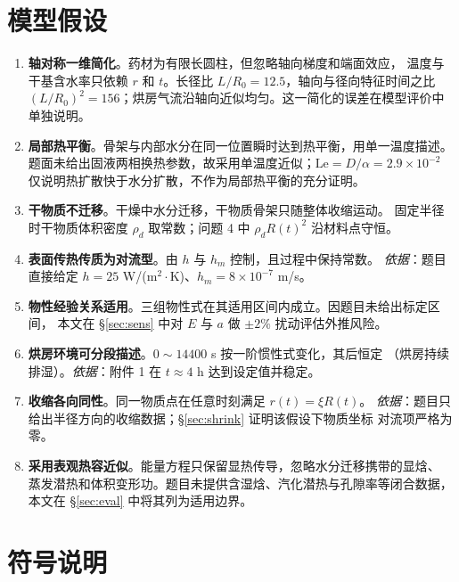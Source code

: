 \documentclass[bwprint]{cumcmthesis}
\begin{document}
\section{模型假设}

\begin{enumerate}[leftmargin=1.9em,itemsep=2pt]
\item \textbf{轴对称一维简化}。药材为有限长圆柱，但忽略轴向梯度和端面效应，
温度与干基含水率只依赖 $r$ 和 $t$。长径比 $L/R_0=12.5$，轴向与径向特征时间之比
$(L/R_0)^2=156$；烘房气流沿轴向近似均匀。这一简化的误差在模型评价中单独说明。
\item \textbf{局部热平衡}。骨架与内部水分在同一位置瞬时达到热平衡，用单一温度描述。
题面未给出固液两相换热参数，故采用单温度近似；$\mathrm{Le}=D/\alpha=2.9\times10^{-2}$
仅说明热扩散快于水分扩散，不作为局部热平衡的充分证明。
\item \textbf{干物质不迁移}。干燥中水分迁移，干物质骨架只随整体收缩运动。
固定半径时干物质体积密度 $\rho_d$ 取常数；问题 4 中 $\rho_dR(t)^2$ 沿材料点守恒。
\item \textbf{表面传热传质为对流型}。由 $h$ 与 $h_m$ 控制，且过程中保持常数。
\emph{依据}：题目直接给定 $h=25$ W/(m$^2\cdot$K)、$h_m=8\times10^{-7}$ m/s。
\item \textbf{物性经验关系适用}。三组物性式在其适用区间内成立。因题目未给出标定区间，
本文在 \S\ref{sec:sens} 中对 $E$ 与 $a$ 做 $\pm2\%$ 扰动评估外推风险。
\item \textbf{烘房环境可分段描述}。$0\sim14400$ s 按一阶惯性式变化，其后恒定
（烘房持续排湿）。\emph{依据}：附件 1 在 $t\approx4$ h 达到设定值并稳定。
\item \textbf{收缩各向同性}。同一物质点在任意时刻满足 $r(t)=\xi R(t)$。
\emph{依据}：题目只给出半径方向的收缩数据；\S\ref{sec:shrink} 证明该假设下物质坐标
对流项严格为零。
\item \textbf{采用表观热容近似}。能量方程只保留显热传导，忽略水分迁移携带的显焓、
蒸发潜热和体积变形功。题目未提供含湿焓、汽化潜热与孔隙率等闭合数据，
本文在 \S\ref{sec:eval} 中将其列为适用边界。
\end{enumerate}

\section{符号说明}
\end{document}
